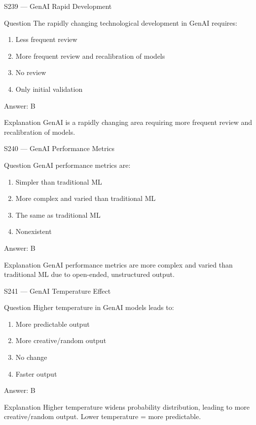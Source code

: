 \documentclass[aspectratio=169,8pt]{beamer}
\begin{document}
\begin{frame}{S239 --- GenAI Rapid Development}
	\begin{block}{Question}
		The rapidly changing technological development in GenAI requires:
		\begin{enumerate}
			\item Less frequent review
			\item More frequent review and recalibration of models
			\item No review
			\item Only initial validation
		\end{enumerate}
	\end{block}
	\begin{exampleblock}{Answer: B}\end{exampleblock}
	\begin{block}{Explanation}
		GenAI is a rapidly changing area requiring more frequent review and recalibration of models.
	\end{block}
\end{frame}

\begin{frame}{S240 --- GenAI Performance Metrics}
	\begin{block}{Question}
		GenAI performance metrics are:
		\begin{enumerate}
			\item Simpler than traditional ML
			\item More complex and varied than traditional ML
			\item The same as traditional ML
			\item Nonexistent
		\end{enumerate}
	\end{block}
	\begin{exampleblock}{Answer: B}\end{exampleblock}
	\begin{block}{Explanation}
		GenAI performance metrics are more complex and varied than traditional ML due to open-ended, unstructured output.
	\end{block}
\end{frame}

\begin{frame}{S241 --- GenAI Temperature Effect}
	\begin{block}{Question}
		Higher temperature in GenAI models leads to:
		\begin{enumerate}
			\item More predictable output
			\item More creative/random output
			\item No change
			\item Faster output
		\end{enumerate}
	\end{block}
	\begin{exampleblock}{Answer: B}\end{exampleblock}
	\begin{block}{Explanation}
		Higher temperature widens probability distribution, leading to more creative/random output. Lower temperature = more predictable.
	\end{block}
\end{frame}
\end{document}
